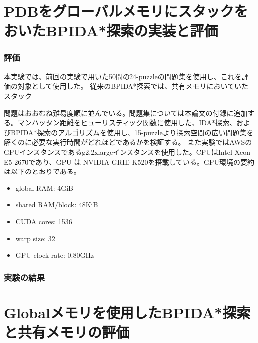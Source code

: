 \documentclass[a4paper,11pt,oneside,openany]{jsbook}
\begin{document}





\chapter{PDBをグローバルメモリにスタックをおいたBPIDA*探索の実装と評価}

\subsection{評価}
本実験では、前回の実験で用いた50問の24-puzzleの問題集を使用し、これを評価の対象として使用した。
従来のBPIDA*探索では、共有メモリにおいていたスタック

問題はおおむね難易度順に並んでいる。問題集については本論文の付録に追加する。マンハッタン距離をヒューリスティック関数に使用した、IDA*探索、およびBPIDA*探索\cite{HA17}のアルゴリズムを使用し、15-puzzleより探索空間の広い問題集を解くのに必要な実行時間がどれほどであるかを検証する。
また実験ではAWSのGPUインスタンスであるg2.2xlargeインスタンスを使用した。CPUはIntel Xeon E5-2670であり、GPU
は NVIDIA GRID K520を搭載している。GPU環境の要約は以下のとおりである。
\begin{itemize}
 \item global RAM: 4GiB
 \item shared RAM/block: 48KiB
 \item CUDA cores: 1536
 \item warp size: 32
 \item GPU clock rate: 0.80GHz
\end{itemize}

\subsection{実験の結果}

\chapter{Globalメモリを使用したBPIDA*探索と共有メモリの評価}
\end{document}
